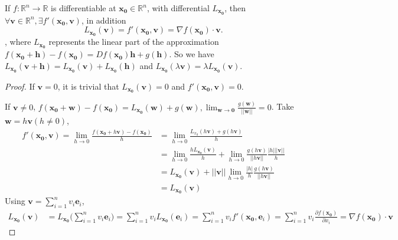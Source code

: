 \begin{proposition}
    If $f: \mathbb{R}^{n} \to \mathbb{R}$ is differentiable at $\mathbf{x_0}\in \mathbb{R}^{n}$, with differential $L_\mathbf{x_0}$, then $\forall \mathbf{v} \in \mathbb{R}^{n}, \exists f'(\mathbf{x_0}, \mathbf{v})$, in addition \[
        L_\mathbf{x_0}(\mathbf{v}) = f'(\mathbf{x_0},\mathbf{v})= \nabla f(\mathbf{x_0}) \cdot \mathbf{v}.
    \]
    , where $L_\mathbf{x_0}$ represents the linear part of the approximation $f(\mathbf{x_0}+\mathbf{h})-f(\mathbf{x_0}) = Df(\mathbf{x_0})\mathbf{h}+g(\mathbf{h})$. So we have $L_\mathbf{x_0}(\mathbf{v} + \mathbf{h})= L_\mathbf{x_0}(\mathbf{v})+L_\mathbf{x_0}(\mathbf{h})$ and $L_\mathbf{x_0}(\lambda \mathbf{v})=\lambda L_\mathbf{x_0}(\mathbf{v})$.
\end{proposition}

\begin{proof}
    If $\mathbf{v} = 0$, it is trivial that $L_{\mathbf{x_0}}(\mathbf{v}) = 0$ and $f'(\mathbf{x_0},\mathbf{v}) = 0$.

    If $\mathbf{v} \neq 0$, $f(\mathbf{x_0} + \mathbf{w}) - f(\mathbf{x_0})= L_\mathbf{x_0}(\mathbf{w}) + g(\mathbf{w}), \lim_{\mathbf{w} \to \mathbf{0}} \frac{g(\mathbf{w})}{||\mathbf{w}||} = 0$. Take $\mathbf{w} = h \mathbf{v} (h \neq 0)$, \begin{align*}
        f'(\mathbf{x_0},\mathbf{v}) = \lim_{h \to 0} \frac{f(\mathbf{x_0}+h \mathbf{v}) - f(\mathbf{x_0})}{h} & = \lim_{h \to 0} \frac{L_{x_0}(h \mathbf{v}) + g(h \mathbf{v})}{h}                                                                           \\
                                                                                                              & =\lim_{h \to 0} \frac{h L_\mathbf{x_0}(\mathbf{v})}{h} + \lim_{h \to 0} \frac{g(h \mathbf{v})}{||h \mathbf{v}||} \frac{|h|||\mathbf{v}||}{h} \\
                                                                                                              & = L_\mathbf{x_0}(\mathbf{v}) + ||\mathbf{v}|| \lim_{h \to 0} \frac{|h|}{h}\frac{g(h \mathbf{v})}{||h \mathbf{v}||}                           \\
                                                                                                              & = L_\mathbf{x_0}(\mathbf{v})
    \end{align*}
    Using $\mathbf{v} = \sum_{i=1}^{n} v_i \mathbf{e}_i$, \begin{align*}
        L_\mathbf{x_0}(\mathbf{v}) & = L_\mathbf{x_0}\Big(\sum_{i=1}^{n} v_i \mathbf{e}_i \Big) = \sum_{i=1}^{n} v_i L_\mathbf{x_0}(\mathbf{e}_i) = \sum_{i=1}^{n} v_i f'(\mathbf{x_0}, \mathbf{e}_i) = \sum_{i=1}^{n} v_i \frac{\partial f(\mathbf{x_0})}{\partial x_i} = \nabla f(\mathbf{x_0}) \cdot  \mathbf{v}
    \end{align*}
\end{proof}


